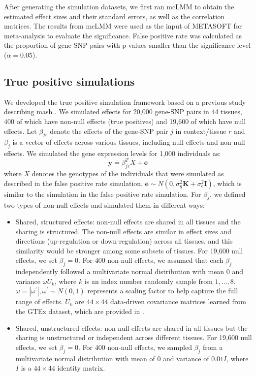         After generating the simulation datasets, we first ran mcLMM to obtain the estimated effect sizes and their standard errors, as well as the correlation matrices. The results from mcLMM were used as the input of METASOFT for meta-analysis to evaluate the significance. False positive rate was calculated as the proportion of gene-SNP pairs with p-values smaller than the significance level ($\alpha = 0.05$).
    
    \subsection{True positive simulations}
        We developed the true positive simulation framework based on a previous study describing mash \cite{Urbut2019}. We simulated effects for 20,000 gene-SNP pairs in 44 tissues, 400 of which have non-null effects (true positives) and 19,600 of which have null effects. Let $\beta_{jr}$ denote the effects of the gene-SNP pair $j$ in context/tissue $r$ and $\beta_j$ is a vector of effects across various tissues, including null effects and non-null effects. We simulated the gene expression levels for 1,000 individuals as:
            \begin{equation}
                \mathbf{y} = \beta_{jr}^T X + \mathbf{e}
            \end{equation}
        where $X$ denotes the genotypes of the individuals that were simulated as described in the false positive rate simulation. $\mathbf{e} \sim N(0,\sigma_g^2\mathbf{K} + \sigma_e^2\mathbf{I})$, which is similar to the simulation in the false positive rate simulation. For $\beta_j$, we defined two types of non-null effects and simulated them in different ways:
        \begin{itemize}
            \item Shared, structured effects: non-null effects are shared in all tissues and the sharing is structured. The non-null effects are similar in effect sizes and directions (up-regulation or down-regulation) across all tissues, and this similarity would be stronger among some subsets of tissues. For 19,600 null effects, we set $\beta_j=0$. For 400 non-null effects, we assumed that each $\beta_j$ independently followed a multivariate normal distribution with mean 0 and variance $\omega U_k$,
            where $k$ is an index number randomly sample from ${1,\ldots,8}$. $\omega = |\omega^\prime|, \omega^\prime \sim N(0, 1)$ represents a scaling factor to help capture the full range of effects. $U_k$ are $44 \times 44$ data-driven covariance matrices learned from the GTEx dataset, which are provided in \cite{Urbut2019}.
            \item Shared, unstructured effects: non-null effects are shared in all tissues but the sharing is unstructured or independent across different tissues. For 19,600 null effects, we set $\beta_j=0$. For 400 non-null effects, we sampled $\beta_j$ from a multivariate normal distribution with mean of 0 and variance of $0.01I$, where $I$ is a $44 \times 44$ identity matrix.
        \end{itemize}
        
